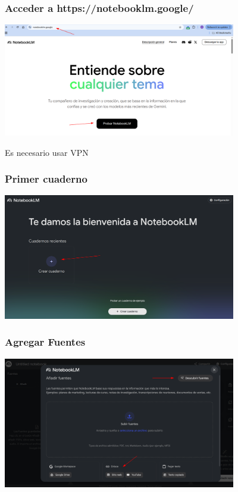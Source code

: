 \documentclass[aspectratio=43]{beamer}
\begin{document}
\begin{frame}
  \frametitle{Acceder a https://notebooklm.google/}
  \begin{center}
    \includegraphics[width=4in]{acceder.png}
  \end{center}
  Es necesario usar VPN
\end{frame}

\begin{frame}
  \frametitle{Primer cuaderno}
  \begin{center}
    \includegraphics[width=4in]{inicios.png}
  \end{center}
\end{frame}

\begin{frame}
  \frametitle{Agregar Fuentes}
  \begin{center}
    \includegraphics[width=4in]{fuentes.png}
  \end{center}
\end{frame}
\end{document}

